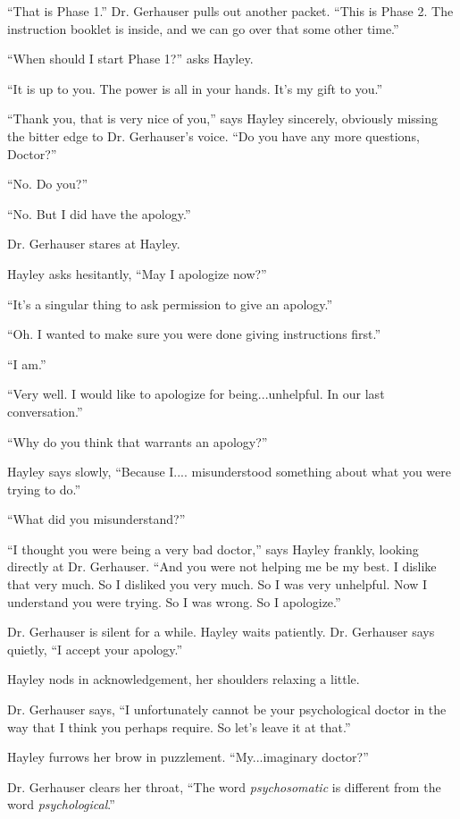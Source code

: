 ``That is Phase 1.''  Dr. Gerhauser pulls out another packet.  ``This is Phase 2.  The instruction booklet is inside, and we can go over that some other time.''

``When should I start Phase 1?'' asks Hayley.

``It is up to you.  The power is all in your hands.  It's my gift to you.''

``Thank you, that is very nice of you,'' says Hayley sincerely, obviously missing the bitter edge to Dr. Gerhauser's voice.  ``Do you have any more questions, Doctor?''

``No.  Do you?''

``No.  But I did have the apology.''

Dr. Gerhauser stares at Hayley.

Hayley asks hesitantly, ``May I apologize now?''

``It's a singular thing to ask permission to give an apology.''

``Oh.  I wanted to make sure you were done giving instructions first.''

``I am.''

``Very well.  I would like to apologize for being...unhelpful.  In our last conversation.''

``Why do you think that warrants an apology?''

Hayley says slowly, ``Because I.... misunderstood something about what you were trying to do.''

``What did you misunderstand?''

``I thought you were being a very bad doctor,'' says Hayley frankly, looking directly at Dr. Gerhauser.  ``And you were not helping me be my best.  I dislike that very much.  So I disliked you very much.   So I was very unhelpful.  Now I understand you were trying.  So I was wrong.  So I apologize.''

Dr. Gerhauser is silent for a while.  Hayley waits patiently.  Dr. Gerhauser says quietly, ``I accept your apology.''

Hayley nods in acknowledgement, her shoulders relaxing a little.

Dr. Gerhauser says, ``I unfortunately cannot be your psychological doctor in the way that I think you perhaps require.  So let's leave it at that.''

Hayley furrows her brow in puzzlement.  ``My...imaginary doctor?''

Dr. Gerhauser clears her throat, ``The word \textit{psychosomatic }is different from the word \textit{psychological}.''

